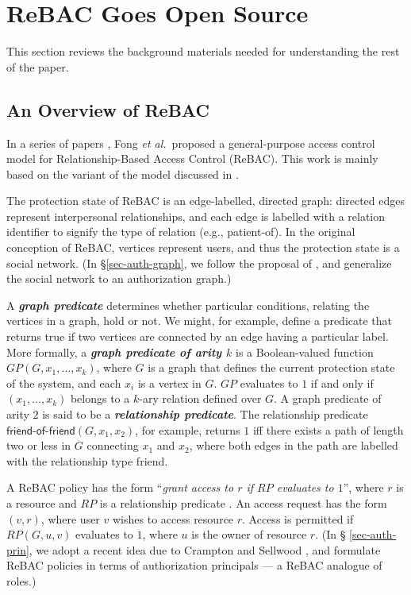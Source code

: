 \documentclass{acm_proc_article-sp}
\newcommand{\Dfn}[1]{\textbf{\emph{#1}}}
\begin{document}
\section{R\MakeLowercase{e}BAC Goes Open Source}

This section reviews the background materials needed for understanding
the rest of the paper.

\subsection{An Overview of ReBAC}

In a series of papers \cite{Fong:2011, Fong-Siahaan:2011,
  Bruns-etal:2012}, Fong \emph{et al.}~proposed a general-purpose
access control model for Relationship-Based Access Control (ReBAC).
This work is mainly based on the variant of the model discussed in
\cite{Bruns-etal:2012}.

The protection state of ReBAC is an edge-labelled, directed graph:
directed edges represent interpersonal relationships, and each edge is
labelled with a relation identifier to signify the type of relation
(e.g., \textsf{patient-of}).  In the original conception of ReBAC,
vertices represent users, and thus the protection state is a social
network.  (In \S \ref{sec-auth-graph}, we follow the proposal of
\cite{Crampton-Sellwood:2014}, and generalize the social network to an
authorization graph.)

A \Dfn{graph predicate} determines whether particular conditions,
relating the vertices in a graph, hold or not.  We might, for example,
define a predicate that returns true if two vertices are connected by
an edge having a particular label.  More formally, a \Dfn{graph
  predicate of arity $k$} is a Boolean-valued function $\mathit{GP}(G,
x_1, \ldots, x_k)$, where $G$ is a graph that defines the current
protection state of the system, and each $x_i$ is a vertex in $G$.
$\mathit{GP}$ evaluates to $1$ if and only if $(x_1, \ldots, x_k)$
belongs to a $k$-ary relation defined over $G$. A graph predicate
of arity $2$ is said to be a \Dfn{relationship predicate}.
The relationship predicate $\textsf{friend-of-friend}(G, x_1, x_2)$,
for example, returns $1$ iff there exists a path of length two or less
in $G$ connecting $x_1$ and $x_2$, where both
edges in the path are labelled with the relationship type \textsf{friend}.





A ReBAC policy has the form ``\emph{grant access to $r$ if
  $\mathit{RP}$ evaluates to $1$}'', where $r$ is a resource and
$\mathit{RP}$ is a relationship predicate \cite{Bruns-etal:2012}.  An
access request has the form $(v, r)$, where user $v$ wishes to access
resource $r$.  Access is permitted if $\mathit{RP}(G, u, v)$ evaluates
to $1$, where $u$ is the owner of resource $r$.  (In \S
\ref{sec-auth-prin}, we adopt a recent idea due to
Crampton and Sellwood \cite{Crampton-Sellwood:2014},
and formulate ReBAC policies in terms of authorization principals
--- a ReBAC analogue of roles.)
\end{document}
